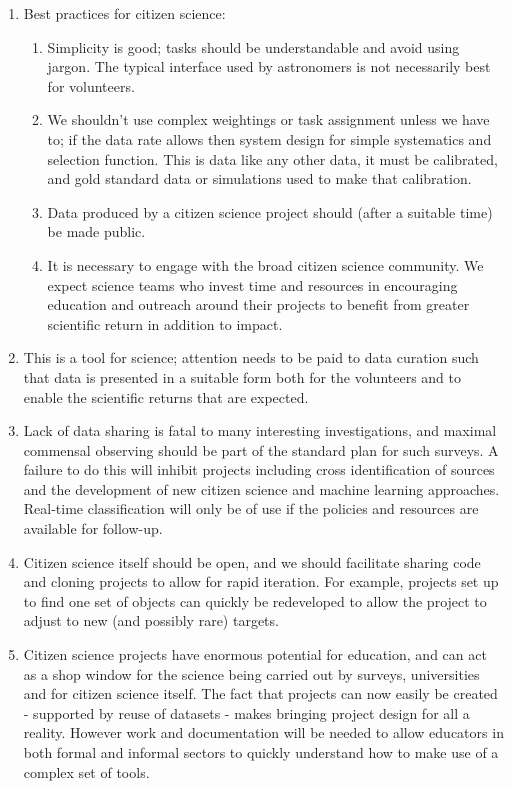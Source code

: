 \documentclass{pasa}
\begin{document}
\begin{enumerate}
\item Best practices for citizen science: 
\begin{enumerate}
\item Simplicity is good; tasks should be understandable and avoid using jargon. The typical interface used by astronomers is not necessarily best for volunteers. 
\item We shouldn't use complex weightings or task assignment unless we have to; if the data rate allows then system design for simple systematics and selection function. This is data like any other data, it must be calibrated, and gold standard data or simulations used to make that calibration.
\item Data produced by a citizen science project should (after a suitable time) be made public. 
\item It is necessary to engage with the broad citizen science community. We expect science teams who invest time and resources in encouraging education and outreach around their projects to benefit from greater scientific return in addition to impact. 
\end{enumerate}

\item This is a tool for science; attention needs to be paid to data curation such that data is presented in a suitable form both for the volunteers and to enable the scientific returns that are expected. 
	
\item Lack of data sharing is fatal to many interesting investigations, and maximal commensal observing should be part of the standard plan for such surveys. A failure to do this will inhibit projects including cross identification of sources and the development of new citizen science and machine learning approaches. Real-time classification will only be of use if the policies and resources are available for follow-up. 

\item Citizen science itself should be open, and we should facilitate sharing code and cloning projects to allow for rapid iteration. For example, projects set up to find one set of objects can quickly be redeveloped to allow the project to adjust to new (and possibly rare) targets.

\item Citizen science projects have enormous potential for education, and can act as a shop window for the science being carried out by surveys, universities and for citizen science itself. The fact that projects can now easily be created - supported by reuse of datasets - makes bringing project design for all a reality. However work and documentation will be needed to allow educators in both formal and informal sectors to quickly understand how to make use of a complex set of tools. 

\end{enumerate} 
\end{document}
